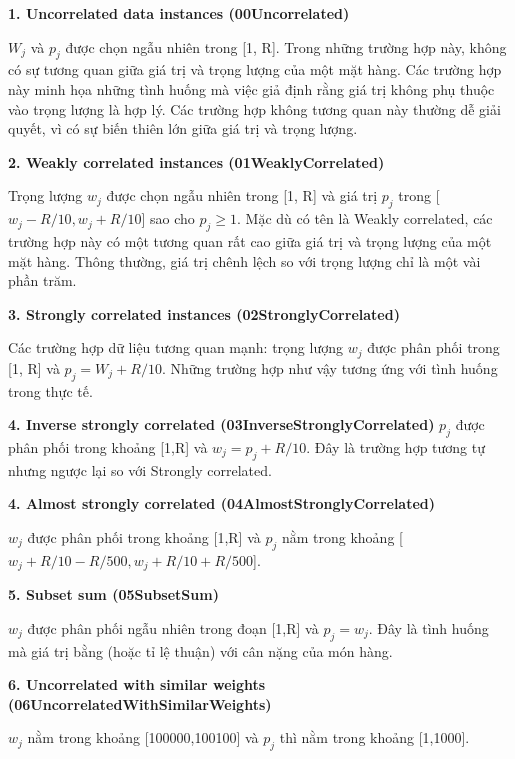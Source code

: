\documentclass[12pt]{article}
\begin{document}
\hspace{-1em}\textbf{1. Uncorrelated data instances (00Uncorrelated)} 

$W_j$ và $p_j$ được chọn ngẫu nhiên trong [1, R]. Trong những trường hợp này, không có sự tương quan giữa giá trị và trọng lượng của một mặt hàng. Các trường hợp này minh họa những tình huống mà việc giả định rằng giá trị không phụ thuộc vào trọng lượng là hợp lý. Các trường hợp không tương quan này thường dễ giải quyết, vì có sự biến thiên lớn giữa giá trị và trọng lượng.

\hspace{-1em}\textbf{2. Weakly correlated instances (01WeaklyCorrelated)} 

Trọng lượng $w_j$ được chọn ngẫu nhiên trong [1, R] và giá trị $p_j$ trong [$w_j - R / 10, w_j + R / 10$] sao cho $p_j \geq 1$. Mặc dù có tên là Weakly correlated, các trường hợp này có một tương quan rất cao giữa giá trị và trọng lượng của một mặt hàng. Thông thường, giá trị chênh lệch so với trọng lượng chỉ là một vài phần trăm. 

\hspace{-1em}\textbf{3. Strongly correlated instances (02StronglyCorrelated)} 

Các trường hợp dữ liệu tương quan mạnh: trọng lượng $w_j$ được phân phối trong [1, R] và $p_j = W_j +R/10$. Những trường hợp như vậy tương ứng với tình huống trong thực tế.

\hspace{-1em}\textbf{4. Inverse strongly correlated (03InverseStronglyCorrelated)} 
$p_j$ được phân phối trong khoảng [1,R] và $w_j = p_j + R/10.$ Đây là trường hợp tương tự nhưng ngược lại so với Strongly correlated.

\hspace{-1em}\textbf{4. Almost strongly correlated (04AlmostStronglyCorrelated)}

$w_j$ được phân phối trong khoảng [1,R] và $p_j$ nằm trong khoảng [$w_j + R/10 - R/500, w_j + R/10 + R/500$].

\hspace{-1em}\textbf{5. Subset sum (05SubsetSum)}

$w_j$ được phân phối ngẫu nhiên trong đoạn [1,R] và $p_j = w_j$. Đây là tình huống mà giá trị bằng (hoặc tỉ lệ thuận) với cân nặng của món hàng.

\hspace{-1em}\textbf{6. Uncorrelated with similar weights (06UncorrelatedWithSimilarWeights)}

$w_j$ nằm trong khoảng [100000,100100] và $p_j$ thì nằm trong khoảng [1,1000].
\end{document}
